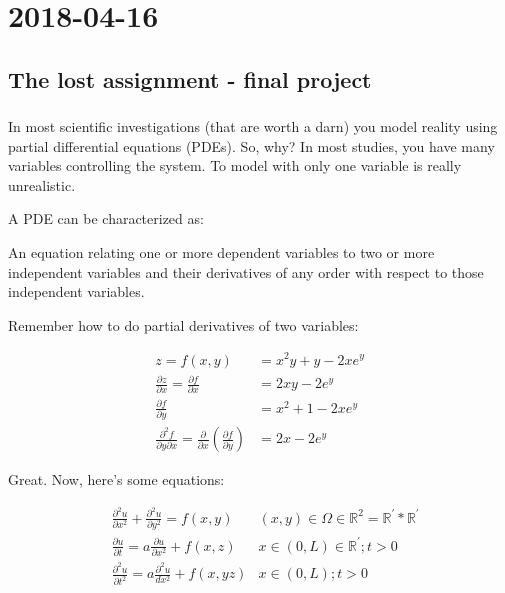 \section{2018-04-16}

\subsection{The lost assignment - final project}

\subsubsection{}

In most scientific investigations (that are worth a darn) you model reality using partial differential equations (PDEs). So, why? In most studies, you have many variables controlling the system. To model with only one variable is really unrealistic.

A PDE can be characterized as:

An equation relating one or more dependent variables to two or more independent variables and their derivatives of any order with respect to those independent variables. 

Remember how to do partial derivatives of two variables:

\begin{align*}
  z = f(x, y)                                                                                              & = x^2y + y - 2xe^y \\
  \frac{\partial z}{\partial x} = \frac{\partial f}{\partial x}                                            & = 2xy - 2e^y \\
  \frac{\partial f}{\partial y}                                                                            & = x^2 + 1 - 2xe^y \\
  \frac{\partial ^2 f}{\partial y\partial x} = \frac{\partial }{\partial x}(\frac{\partial f}{\partial y}) & = 2x - 2e^y
\end{align*}

Great. Now, here's some equations:

\begin{align*}
  &\frac{\partial^2 u}{\partial x^2} + \frac{\partial ^2 u}{\partial y^2} = f(x, y)    &(x, y) \in \Omega \in \mathbb{R}^2 = \mathbb{R}^\prime  * \mathbb{R}^\prime \\
  &\frac{\partial u}{\partial t} = a \frac{\partial u}{\partial x^2} + f(x, z)          &x \in (0, L) \in \mathbb{R}^\prime ; t > 0 \\
  &\frac{\partial ^2 u}{\partial t^2} = a \frac{\partial ^2 u}{dx^2} + f(x, yz) &x \in (0, L) ; t > 0 
\end{align*}

